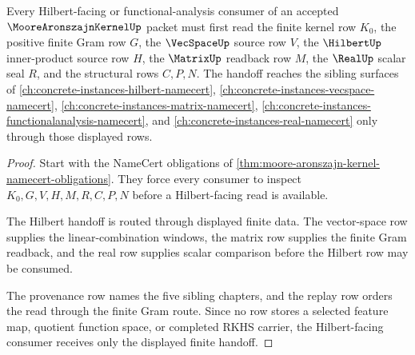 \begin{theorem}
\label{thm:moore-aronszajn-kernel-hilbert-handoff}
Every Hilbert-facing or functional-analysis consumer of an accepted $\MooreAronszajnKernelUp$ packet must first read the finite kernel row $K_0$, the positive finite Gram row $G$, the $\VecSpaceUp$ source row $V$, the $\HilbertUp$ inner-product source row $H$, the $\MatrixUp$ readback row $M$, the $\RealUp$ scalar seal $R$, and the structural rows $C,P,N$. The handoff reaches the sibling surfaces of \autoref{ch:concrete-instances-hilbert-namecert}, \autoref{ch:concrete-instances-vecspace-namecert}, \autoref{ch:concrete-instances-matrix-namecert}, \autoref{ch:concrete-instances-functionalanalysis-namecert}, and \autoref{ch:concrete-instances-real-namecert} only through those displayed rows.
\end{theorem}
\begin{proof}
Start with the NameCert obligations of \autoref{thm:moore-aronszajn-kernel-namecert-obligations}. They force every consumer to inspect $K_0,G,V,H,M,R,C,P,N$ before a Hilbert-facing read is available.

The Hilbert handoff is routed through displayed finite data. The vector-space row supplies the linear-combination windows, the matrix row supplies the finite Gram readback, and the real row supplies scalar comparison before the Hilbert row may be consumed.

The provenance row names the five sibling chapters, and the replay row orders the read through the finite Gram route. Since no row stores a selected feature map, quotient function space, or completed RKHS carrier, the Hilbert-facing consumer receives only the displayed finite handoff.
\end{proof}

